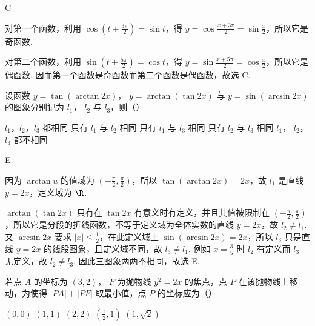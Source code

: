 \documentclass[UTF8,a4paper,oneside,11pt]{ctexbook}
\begin{document}
\begin{answer}
C
\end{answer}

\begin{solution}
对第一个函数，利用 \(\cos(t+\frac{3\pi}{2})=\sin t\)，得
\(y=\cos\frac{x+3\pi}{2}=\sin\frac{x}{2}\)，所以它是奇函数.

对第二个函数，利用 \(\sin(t+\frac{5\pi}{2})=\cos t\)，得
\(y=\sin\frac{x+5\pi}{2}=\cos\frac{x}{2}\)，所以它是偶函数. 因而第一个函数是奇函数而第二个函数是偶函数，故选 C.
\end{solution}

\begin{problem}

设函数 \(y = \tan(\arctan 2x) \)， \(y = \arctan(\tan 2x) \) 与 \(y = \sin(\arcsin 2x) \) 的图象分别记为 \(l_1 \)， \(l_2 \) 与 \(l_3 \)，则（\quad）

\choicesfive
    {\(l_1 \)，\(l_2 \)，\(l_3 \) 都相同}
    {只有 \(l_1 \) 与 \(l_2 \) 相同}
    {只有 \(l_1 \) 与 \(l_3 \) 相同}
    {只有 \(l_2 \) 与 \(l_3 \) 相同}
    {\(l_1 \)， \(l_2 \)， \(l_3 \) 都不相同}
\end{problem}

\begin{answer}
E
\end{answer}

\begin{solution}
因为 \(\arctan u\) 的值域为 \((-\frac{\pi}{2},\frac{\pi}{2})\)，所以
\(\tan(\arctan2x)=2x\)，故 \(l_1\) 是直线 \(y=2x\)，定义域为 \(\R\).

\(\arctan(\tan2x)\) 只有在 \(\tan2x\) 有意义时有定义，并且其值被限制在 \((-\frac{\pi}{2},\frac{\pi}{2})\)，所以它是分段的折线函数，不等于定义域为全体实数的直线 \(y=2x\)，故 \(l_2\ne l_1\). 又 \(\arcsin2x\) 要求 \(|x|\leq\frac12\)，在此定义域上 \(\sin(\arcsin2x)=2x\)，所以 \(l_3\) 只是直线 \(y=2x\) 的线段图象，且定义域不同，故 \(l_3\ne l_1\). 例如 \(x=\frac35\) 时 \(l_2\) 有定义而 \(l_3\) 无定义，故 \(l_2\ne l_3\). 因此三图象两两不相同，故选 E.
\end{solution}

\begin{problem}

若点 \(A\) 的坐标为 \((3,2) \)， \(F\) 为抛物线 \(y^2 = 2x \) 的焦点，点 \(P\) 在该抛物线上移动，为使得 \(|PA| + |PF| \) 取最小值，点 \(P\) 的坐标应为（\quad）

\choicesfive
    {\((0,0) \)}
    {\((1,1) \)}
    {\((2,2) \)}
    {\(\left(\frac{1}{2},1\right) \)}
    {\((1,\sqrt{2})\)}
\end{problem}
\end{document}
